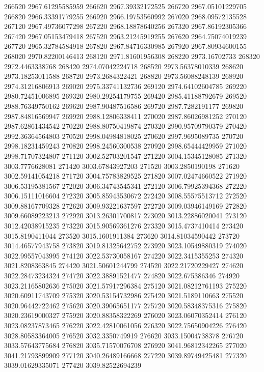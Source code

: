 {266520 2967.61295585959
266620 2967.39332172525
266720 2967.05101229705
266820 2966.33391779255
266920 2966.19753560992
267020 2968.09572135528
267120 2967.49736077298
267220 2968.18878640256
267320 2967.86192305366
267420 2967.05153479418
267520 2963.21245919255
267620 2964.75074019239
267720 2965.32784584918
267820 2967.84716330985
267920 2967.80934600155
268020 2970.82200146413
268120 2971.81601956308
268220 2973.16702733
268320 2972.4463338768
268420 2974.07042224718
268520 2973.56378010339
268620 2973.18253011588
268720 2973.2684322421
268820 2973.56088248139
268920 2974.31216806913
269020 2975.33741132736
269120 2974.64102604785
269220 2980.72451006895
269320 2980.29254179755
269420 2985.41188792679
269520 2988.76349750162
269620 2987.90487516586
269720 2987.7282191177
269820 2987.84816569947
269920 2988.12806338411
270020 2987.86026981252
270120 2987.62861434542
270220 2988.80750419874
270320 2990.95709790379
270420 2992.36364564803
270520 2998.04984818025
270620 2997.9695089735
270720 2998.18231459243
270820 2998.24560300538
270920 2998.65444429959
271020 2998.71707324807
271120 3002.52703201547
271220 3004.15345128085
271320 3003.7776628081
271420 3003.67843927203
271520 3003.2850190198
271620 3002.59141054218
271720 3004.75783829525
271820 3007.02474660522
271920 3006.53195381567
272020 3006.34743545341
272120 3006.79925394368
272220 3006.15111016604
272320 3005.85943530672
272420 3008.55575513712
272520 3009.88167709328
272620 3009.93221637597
272720 3009.03946149169
272820 3009.66089223213
272920 3013.26301700817
273020 3013.22886020041
273120 3012.42038915235
273220 3015.90569361276
273320 3015.4737410414
273420 3015.8190411044
273520 3015.1601911384
273620 3014.81034590442
273720 3014.46577943758
273820 3019.81325642752
273920 3023.10549880319
274020 3022.99557043995
274120 3022.53730058167
274220 3022.3415355253
274320 3021.8208363845
274420 3021.50601244799
274520 3022.21720229427
274620 3022.28473234324
274720 3022.38891521477
274820 3022.675386346
274920 3023.21165802636
275020 3021.57917296384
275120 3021.08212761193
275220 3020.60911743709
275320 3020.53154732986
275420 3021.5189110663
275520 3020.96442722462
275620 3020.39065651177
275720 3020.58348375316
275820 3020.23619000327
275920 3020.88358322269
276020 3023.06070352414
276120 3023.08237873465
276220 3022.42810061056
276320 3022.75650904226
276420 3028.80583364005
276520 3032.3350749919
276620 3033.15004738378
276720 3033.57643775684
276820 3035.71570076708
276920 3041.96812342265
277020 3041.21793899909
277120 3040.26489166668
277220 3039.89749425481
277320 3039.01629335071
277420 3039.82522694239
}
